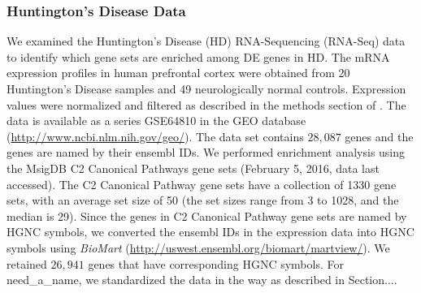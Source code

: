 \documentclass[useAMS,usenatbib, galley]{biom}
\newcommand{\OurMethod}{need\_a\_name}
\begin{document}
	\subsubsection{Huntington's Disease Data}
	We examined the Huntington's Disease (HD) RNA-Sequencing (RNA-Seq) data \citep{labadorf2015rna}  to identify which gene sets are enriched among DE genes in HD. The mRNA expression profiles in human prefrontal cortex were obtained from 20 Huntington's Disease samples and 49 neurologically normal controls.  Expression values were normalized and filtered as described in the methods section of \cite{labadorf2015rna}.
	The data is available as a series GSE64810 in the GEO database (\url{http://www.ncbi.nlm.nih.gov/geo/}). The data set contains $28,087$ genes and the genes are named by their ensembl IDs. We performed enrichment analysis using the MsigDB \citep{subramanian2005gene} C2 Canonical Pathways gene sets (February 5, 2016, data last accessed). The C2 Canonical Pathway gene sets have a collection of 1330 gene sets, with an average set size of 50 (the set sizes range from 3 to 1028, and the median is 29). Since the genes in C2 Canonical Pathway gene sets are named by HGNC symbols, we converted the ensembl IDs in the expression data into HGNC symbols using \textit{BioMart} (\url{http://uswest.ensembl.org/biomart/martview/}). We retained $26,941$ genes that have corresponding HGNC symbols. For \OurMethod, we standardized the data in the way as described in Section....
	
\end{document}
